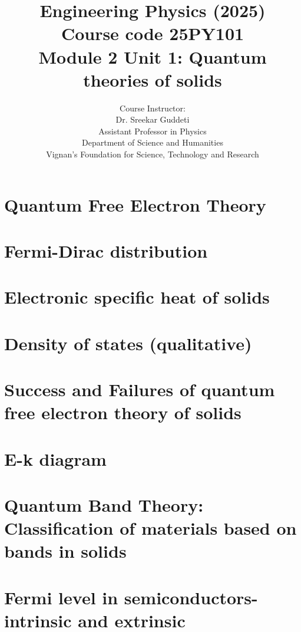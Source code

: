 \documentclass[aspectratio=1610]{beamer}
\title[Engineering Physics]{Engineering Physics (2025) \\ Course code
	25PY101 \\ Module 2 Unit 1: Quantum theories of solids}
\author{Course Instructor:\\ 
	{\color{VignanBlue} Dr. Sreekar Guddeti}\\
	Assistant Professor in Physics\\
	Department of Science and Humanities \\
	{\color{VignanRed}Vignan's Foundation for Science, Technology and Research}
}
\newif\ifshowhidden
\begin{document}
	\begin{frame}[label=titleframe]
		\titlepage
	\end{frame}
	
	\section{Quantum Free Electron Theory}
	
	\section{Fermi-Dirac distribution}
	
	\section{Electronic specific heat of solids}
	
	\section{Density of states (qualitative)}
	
	\section{Success and Failures of quantum free electron theory of solids}
	
	\section{E-k diagram}
	
	\section{Quantum Band Theory: Classification of materials based on bands in solids}
	
	\section{Fermi level in semiconductors- intrinsic and extrinsic}
	
\end{document}
